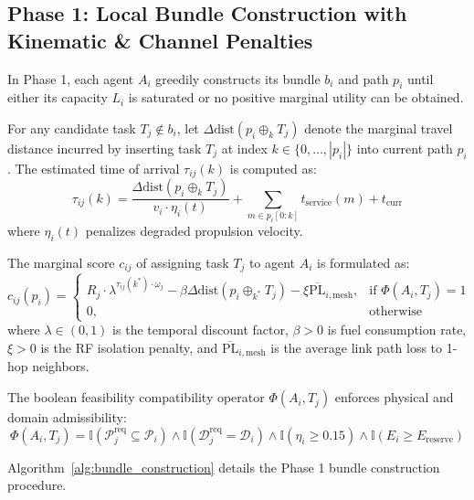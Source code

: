 \documentclass[journal,10pt,twocolumn]{IEEEtran}
\begin{document}
\subsection{Phase 1: Local Bundle Construction with Kinematic & Channel Penalties}
In Phase 1, each agent $A_i$ greedily constructs its bundle $b_i$ and path $p_i$ until either its capacity $L_i$ is saturated or no positive marginal utility can be obtained. 

For any candidate task $T_j \notin b_i$, let $\Delta \text{dist}(p_i \oplus_k T_j)$ denote the marginal travel distance incurred by inserting task $T_j$ at index $k \in \{0, \dots, |p_i|\}$ into current path $p_i$. The estimated time of arrival $\tau_{ij}(k)$ is computed as:
\begin{equation}
\tau_{ij}(k) = \frac{\Delta \text{dist}(p_i \oplus_k T_j)}{v_i \cdot \eta_i(t)} + \sum_{m \in p_i[0:k]} t_{\text{service}}(m) + t_{\text{curr}}
\end{equation}
where $\eta_i(t)$ penalizes degraded propulsion velocity.

The marginal score $c_{ij}$ of assigning task $T_j$ to agent $A_i$ is formulated as:
\begin{equation}
c_{ij}(p_i) = \begin{cases}
R_j \cdot \lambda^{\tau_{ij}(k^*) \cdot \omega_j} - \beta \Delta \text{dist}(p_i \oplus_{k^*} T_j) - \xi \overline{\text{PL}}_{i, \text{mesh}}, & \text{if } \Phi(A_i, T_j) = 1 \\
0, & \text{otherwise}
\end{cases}
\label{eq:marginal_score}
\end{equation}
where $\lambda \in (0, 1)$ is the temporal discount factor, $\beta > 0$ is fuel consumption rate, $\xi > 0$ is the RF isolation penalty, and $\overline{\text{PL}}_{i, \text{mesh}}$ is the average link path loss to 1-hop neighbors.

The boolean feasibility compatibility operator $\Phi(A_i, T_j)$ enforces physical and domain admissibility:
\begin{equation}
\Phi(A_i, T_j) = \mathbb{I}(\mathcal{P}_j^{\text{req}} \subseteq \mathcal{P}_i) \land \mathbb{I}(\mathcal{D}_j^{\text{req}} = \mathcal{D}_i) \land \mathbb{I}(\eta_i \ge 0.15) \land \mathbb{I}(E_i \ge E_{\text{reserve}})
\end{equation}

Algorithm~\ref{alg:bundle_construction} details the Phase 1 bundle construction procedure.
\end{document}
